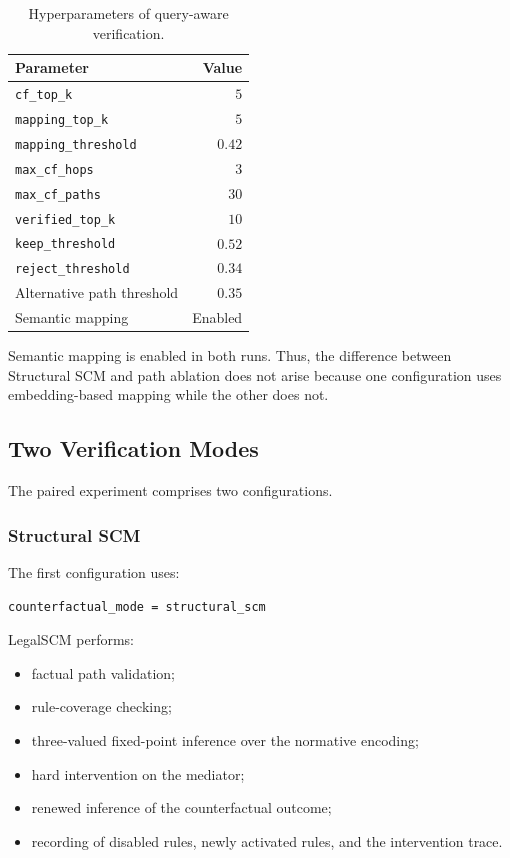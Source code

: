 \begin{table}[t]
    \centering
    \caption{Hyperparameters of query-aware verification.}
    \label{tab:verification-hyperparameters}
    \begin{tabular}{lr}
        \hline
        \textbf{Parameter} & \textbf{Value} \\
        \hline
        \texttt{cf\_top\_k} & \(5\) \\
        \texttt{mapping\_top\_k} & \(5\) \\
        \texttt{mapping\_threshold} & \(0.42\) \\
        \texttt{max\_cf\_hops} & \(3\) \\
        \texttt{max\_cf\_paths} & \(30\) \\
        \texttt{verified\_top\_k} & \(10\) \\
        \texttt{keep\_threshold} & \(0.52\) \\
        \texttt{reject\_threshold} & \(0.34\) \\
        Alternative path threshold & \(0.35\) \\
        Semantic mapping & Enabled \\
        \hline
    \end{tabular}
\end{table}

Semantic mapping is enabled in both runs. Thus, the difference between
Structural SCM and path ablation does not arise because one configuration uses
embedding-based mapping while the other does not.

\subsection{Two Verification Modes}

The paired experiment comprises two configurations.

\subsubsection{Structural SCM}

The first configuration uses:

\begin{verbatim}
counterfactual_mode = structural_scm
\end{verbatim}

LegalSCM performs:

\begin{itemize}
    \item factual path validation;
    \item rule-coverage checking;
    \item three-valued fixed-point inference over the normative encoding;
    \item hard intervention on the mediator;
    \item renewed inference of the counterfactual outcome;
    \item recording of disabled rules, newly activated rules, and the
    intervention trace.
\end{itemize}

